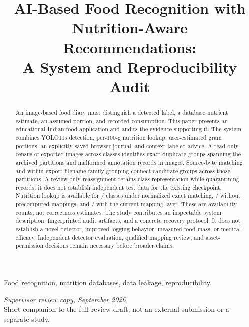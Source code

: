 \documentclass[conference]{IEEEtran}
\begin{document}
\title{AI-Based Food Recognition with Nutrition-Aware Recommendations:\\A System and Reproducibility Audit}
\author{
}
\maketitle
\begin{abstract}
An image-based food diary must distinguish a detected label, a database nutrient estimate, an assumed portion, and recorded consumption. This paper presents an educational Indian-food application and audits the evidence supporting it. The system combines YOLO11s detection, per-100-g nutrition lookup, user-estimated gram portions, an explicitly saved browser journal, and context-labeled advice. A read-only census of \AuditImages{} exported images across \AuditClasses{} classes identifies \AuditDuplicateGroups{} exact-duplicate groups spanning the archived partitions and malformed annotation records in \AuditFlaggedImages{} images. Source-byte matching and within-export filename-family grouping connect \CandidateOldOverlapGroups{} candidate groups across those partitions. A review-only reassignment retains class representation while quarantining \CandidateQuarantinedImages{} records; it does not establish independent test data for the existing checkpoint. Nutrition lookup is available for \CoverageExact{}/\AuditClasses{} classes under normalized exact matching, \CoverageAutomatic{}/\AuditClasses{} without precomputed mappings, and \CoverageCurrent{}/\AuditClasses{} with the current mapping layer. These are availability counts, not correctness estimates. The study contributes an inspectable system description, fingerprinted audit artifacts, and a concrete recovery protocol. It does not establish a novel detector, improved logging behavior, measured food mass, or medical efficacy. Independent detector evaluation, qualified mapping review, and asset-permission decisions remain necessary before broader claims.
\end{abstract}
\begin{IEEEkeywords}
Food recognition, nutrition databases, data leakage, reproducibility.
\end{IEEEkeywords}
\begin{center}
\small\emph{Supervisor review copy, September 2026.}\\
\small Short companion to the full review draft; not an external submission or a separate study.
\end{center}
\end{document}
